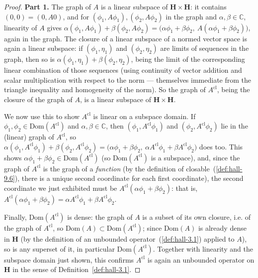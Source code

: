 \begin{proof}
    \leanok
\textbf{Part 1.} The graph of $A$ is a linear subspace of $\mathbf{H} \times \mathbf{H}$: it contains $(0,0) = (0, A0)$, and for $(\phi_1,A\phi_1), (\phi_2,A\phi_2)$ in the graph and $\alpha,\beta \in \mathbb{C}$, linearity of $A$ gives $\alpha(\phi_1,A\phi_1) + \beta(\phi_2,A\phi_2) = \big(\alpha\phi_1+\beta\phi_2,\ A(\alpha\phi_1+\beta\phi_2)\big)$, again in the graph. The closure of a linear subspace of a normed vector space is again a linear subspace: if $(\phi_1,\eta_1)$ and $(\phi_2,\eta_2)$ are limits of sequences in the graph, then so is $\alpha(\phi_1,\eta_1)+\beta(\phi_2,\eta_2)$, being the limit of the corresponding linear combination of those sequences (using continuity of vector addition and scalar multiplication with respect to the norm — themselves immediate from the triangle inequality and homogeneity of the norm). So the graph of $A^{\text{cl}}$, being the closure of the graph of $A$, is a linear subspace of $\mathbf{H} \times \mathbf{H}$.

We now use this to show $A^{\text{cl}}$ is linear on a subspace domain. If $\phi_1,\phi_2 \in \text{Dom}(A^{\text{cl}})$ and $\alpha,\beta \in \mathbb{C}$, then $(\phi_1,A^{\text{cl}}\phi_1)$ and $(\phi_2,A^{\text{cl}}\phi_2)$ lie in the (linear) graph of $A^{\text{cl}}$, so $\alpha(\phi_1,A^{\text{cl}}\phi_1) + \beta(\phi_2,A^{\text{cl}}\phi_2) = \big( \alpha\phi_1+\beta\phi_2,\ \alpha A^{\text{cl}}\phi_1 + \beta A^{\text{cl}}\phi_2 \big)$ does too. This shows $\alpha\phi_1+\beta\phi_2 \in \text{Dom}(A^{\text{cl}})$ (so $\text{Dom}(A^{\text{cl}})$ is a subspace), and, since the graph of $A^{\text{cl}}$ is the graph of a \textit{function} (by the definition of closable~(\ref{def:hall-9.6}), there is a unique second coordinate for each first coordinate), the second coordinate we just exhibited must be $A^{\text{cl}}(\alpha\phi_1+\beta\phi_2)$: that is, $A^{\text{cl}}(\alpha\phi_1+\beta\phi_2) = \alpha A^{\text{cl}}\phi_1 + \beta A^{\text{cl}}\phi_2$.

Finally, $\text{Dom}(A^{\text{cl}})$ is dense: the graph of $A$ is a subset of its own closure, i.e. of the graph of $A^{\text{cl}}$, so $\text{Dom}(A) \subset \text{Dom}(A^{\text{cl}})$; since $\text{Dom}(A)$ is already dense in $\mathbf{H}$ (by the definition of an unbounded operator~(\ref{def:hall-3.1}) applied to $A$), so is any superset of it, in particular $\text{Dom}(A^{\text{cl}})$. Together with linearity and the subspace domain just shown, this confirms $A^{\text{cl}}$ is again an unbounded operator on $\mathbf{H}$ in the sense of Definition~\ref{def:hall-3.1}.


\end{proof}
